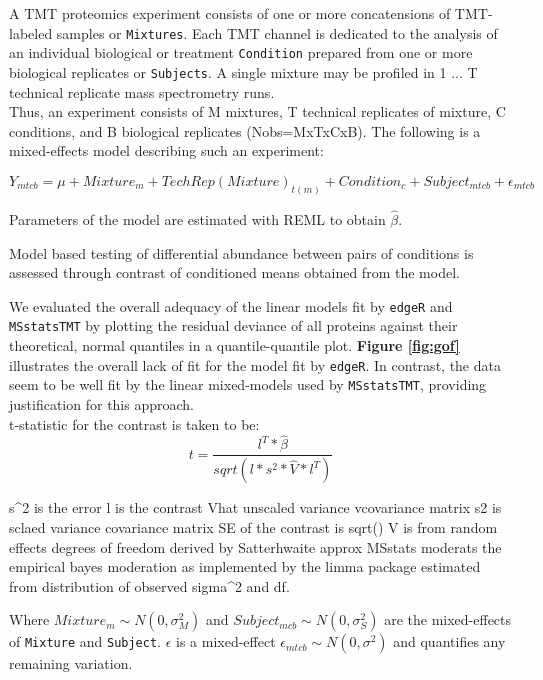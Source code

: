 \documentclass[12pt]{article}
\begin{document}
A TMT proteomics experiment consists of one or more concatensions of TMT-labeled
samples or \texttt{Mixtures}. Each TMT channel is dedicated to the analysis of an 
individual biological or treatment \texttt{Condition} prepared from one
or more biological replicates or \texttt{Subjects}. A single mixture may be 
profiled in 1 ... T technical replicate mass spectrometry runs.  \\

Thus, an experiment consists of M mixtures, T technical replicates of mixture, 
C conditions, and B biological replicates (Nobs=MxTxCxB). The following is 
a mixed-effects model describing such an experiment:

\begin{equation}
	Y_{mtcb} = \mu + Mixture_m + TechRep(Mixture)_{t(m)} + Condition_c + 
	Subject_{mtcb} + \epsilon_{mtcb}
\end{equation}

Parameters of the model are estimated with REML to obtain $\hat{\beta}$.

Model based testing of differential abundance between pairs of conditions
is assessed through contrast of conditioned means obtained from the model.

We evaluated the overall adequacy of the linear models 
fit by \texttt{edgeR} and \texttt{MSstatsTMT} by plotting the residual deviance 
of all proteins against their theoretical, normal quantiles in a 
quantile-quantile plot. \textbf{Figure \ref{fig:gof}} illustrates the overall 
lack of fit for the model fit by \texttt{edgeR}. In contrast, the data seem to
be well fit by the linear mixed-models used by \texttt{MSstatsTMT}, providing
justification for this approach. \\

t-statistic for the contrast is taken to be:
\begin{equation}
	t = \frac{l^T * \hat{\beta}}{sqrt(l * s^2 * \hat{V} * l^T)}
\end{equation}


s^2 is  the error
l is the contrast
Vhat unscaled variance vcovariance matrix
s2 is sclaed variance covariance matrix
SE of the contrast is sqrt()
V is from random effects
degrees of freedom derived by Satterhwaite approx 
MSstats moderats the empirical bayes moderation as implemented by the limma
package estimated from distribution of observed sigma^2 and df.


Where \(Mixture_m \sim N(0,\sigma^2_M)\) and 
\(Subject_{mcb} \sim N(0,\sigma^2_S)\) are the mixed-effects of \texttt{Mixture}
and \texttt{Subject}.
$\epsilon$ is a mixed-effect \(\epsilon_{mtcb} \sim N(0,\sigma^2)\) and
quantifies any remaining variation.
\end{document}
